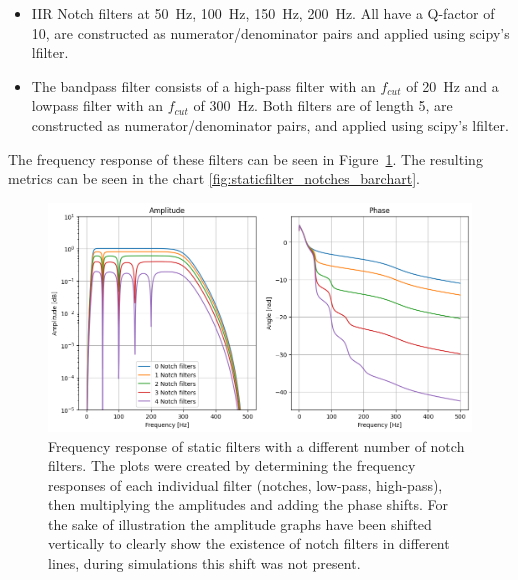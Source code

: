 \begin{itemize}
    \item IIR Notch filters at \SI{50}{Hz}, \SI{100}{Hz}, \SI{150}{Hz}, \SI{200}{Hz}. All have a Q-factor of 10, are constructed as numerator/denominator pairs and applied using scipy's lfilter.
    \item The bandpass filter consists of a high-pass filter with an $f_{cut}$ of \SI{20}{Hz} and a lowpass filter with an $f_{cut}$ of \SI{300}{Hz}. Both filters are of length 5, are constructed as numerator/denominator pairs, and applied using scipy's lfilter.
\end{itemize}

The frequency response of these filters can be seen in Figure~\ref{fig:staticfilter_notches_frequencyresponse}. The resulting metrics can be seen in the chart \ref{fig:staticfilter_notches_barchart}.

\begin{figure}[h!t]
	\begin{center}
		\includegraphics[width=1.0\columnwidth]{images/staticfilter_notches_frequencyresponse.png}
	\end{center}
	\caption{Frequency response of static filters with a different number of notch filters. The plots were created by determining the frequency responses of each individual filter (notches, low-pass, high-pass), then multiplying the amplitudes and adding the phase shifts. For the sake of illustration the amplitude graphs have been shifted vertically to clearly show the existence of notch filters in different lines, during simulations this shift was not present. }
	\label{fig:staticfilter_notches_frequencyresponse}
\end{figure}

